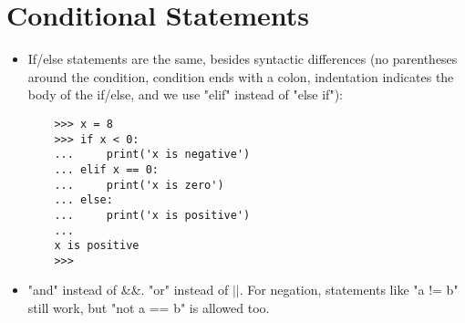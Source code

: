 \documentclass{article}
\begin{document}
\section{Conditional Statements}
\begin{itemize}
    \item If/else statements are the same, besides syntactic differences (no parentheses around the condition, condition ends with a colon, indentation indicates the body of the if/else, and we use "elif" instead of "else if"):
    \begin{lstlisting}
    >>> x = 8
    >>> if x < 0:
    ...     print('x is negative')
    ... elif x == 0:
    ...     print('x is zero')
    ... else:
    ...     print('x is positive')
    ... 
    x is positive
    >>> 
    \end{lstlisting}
    \item "and" instead of \&\&. "or" instead of $||$. For negation, statements like "a != b" still work, but "not a == b" is allowed too.
\end{itemize}
\end{document}
